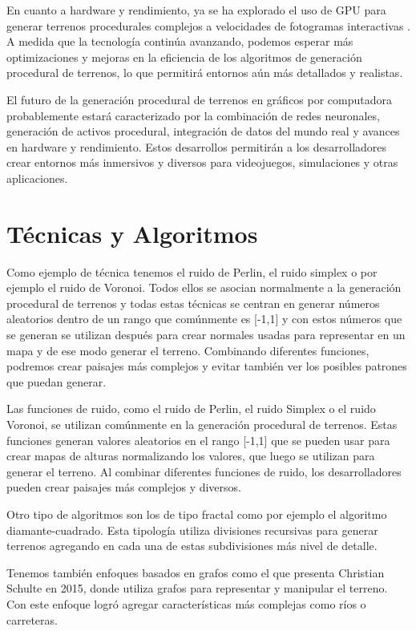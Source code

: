 En cuanto a hardware y rendimiento, ya se ha explorado el uso de GPU para generar terrenos procedurales complejos a velocidades de fotogramas interactivas \cite{proceduralTerrainGpu}. A medida que la tecnología continúa avanzando, podemos esperar más optimizaciones y mejoras en la eficiencia de los algoritmos de generación procedural de terrenos, lo que permitirá entornos aún más detallados y realistas.

El futuro de la generación procedural de terrenos en gráficos por computadora probablemente estará caracterizado por la combinación de redes neuronales, generación de activos procedural, integración de datos del mundo real y avances en hardware y rendimiento. Estos desarrollos permitirán a los desarrolladores crear entornos más inmersivos y diversos para videojuegos, simulaciones y otras aplicaciones.


\section{Técnicas y Algoritmos}

Como ejemplo de técnica tenemos el ruido de Perlin, el ruido simplex o por ejemplo el ruido de Voronoi. Todos ellos se asocian normalmente a la generación procedural de terrenos y todas estas técnicas se centran en generar números aleatorios dentro de un rango que comúnmente es [-1,1] y con estos números que se generan se utilizan después para crear normales usadas para representar en un mapa y de ese modo generar el terreno. Combinando diferentes funciones, podremos crear paisajes más complejos y evitar también ver los posibles patrones que puedan generar.

Las funciones de ruido, como el ruido de Perlin, el ruido Simplex o el ruido Voronoi, se utilizan comúnmente en la generación procedural de terrenos. Estas funciones generan valores aleatorios en el rango [-1,1] que se pueden usar para crear mapas de alturas normalizando los valores, que luego se utilizan para generar el terreno. Al combinar diferentes funciones de ruido, los desarrolladores pueden crear paisajes más complejos y diversos.

Otro tipo de algoritmos son los de tipo fractal como por ejemplo el algoritmo diamante-cuadrado. Esta tipología utiliza divisiones recursivas para generar terrenos agregando en cada una de estas subdivisiones más nivel de detalle.

Tenemos también enfoques basados en grafos como el que presenta Christian Schulte \cite{ProceduralTerrainGeneration} en 2015, donde utiliza grafos para representar y manipular el terreno. Con este enfoque logró agregar características más complejas como ríos o carreteras.

